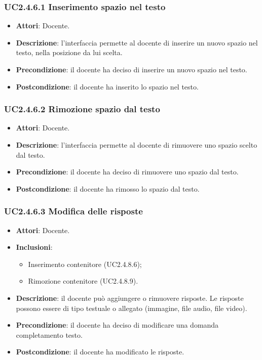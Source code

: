 \subsubsection{UC2.4.6.1 Inserimento spazio nel testo}
\begin{itemize}
\item \textbf{Attori}: Docente.
\item \textbf{Descrizione}: l'interfaccia permette al docente di inserire un nuovo spazio nel testo, nella posizione da lui scelta.
\item \textbf{Precondizione}: il docente ha deciso di inserire un nuovo spazio nel testo.
\item \textbf{Postcondizione}: il docente ha inserito lo spazio nel testo.
\end{itemize}
\subsubsection{UC2.4.6.2 Rimozione spazio dal testo}
\begin{itemize}
\item \textbf{Attori}: Docente.
\item \textbf{Descrizione}: l'interfaccia permette al docente di rimuovere uno spazio scelto dal testo.
\item \textbf{Precondizione}: il docente ha deciso di rimuovere uno spazio dal testo.
\item \textbf{Postcondizione}: il docente ha rimosso lo spazio dal testo.
\end{itemize}
\subsubsection{UC2.4.6.3 Modifica delle risposte }
\begin{itemize}
\item \textbf{Attori}: Docente.
\item \textbf{Inclusioni}:
\begin{itemize}
\item Inserimento contenitore (UC2.4.8.6);
\item Rimozione contenitore (UC2.4.8.9).
\end{itemize}
\item \textbf{Descrizione}: il docente può aggiungere o rimuovere risposte. Le risposte possono essere di tipo testuale o allegato (immagine, file audio, file video).
\item \textbf{Precondizione}: il docente ha deciso di modificare una domanda completamento testo.
\item \textbf{Postcondizione}: il docente ha modificato le risposte.
\end{itemize}
